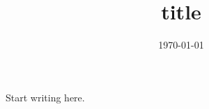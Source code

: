 \documentclass[11pt,a4paper]{article}
\title{{{title}}}
\author{}
\date{\today}
\begin{document}
\maketitle

Start writing here.
\end{document}
